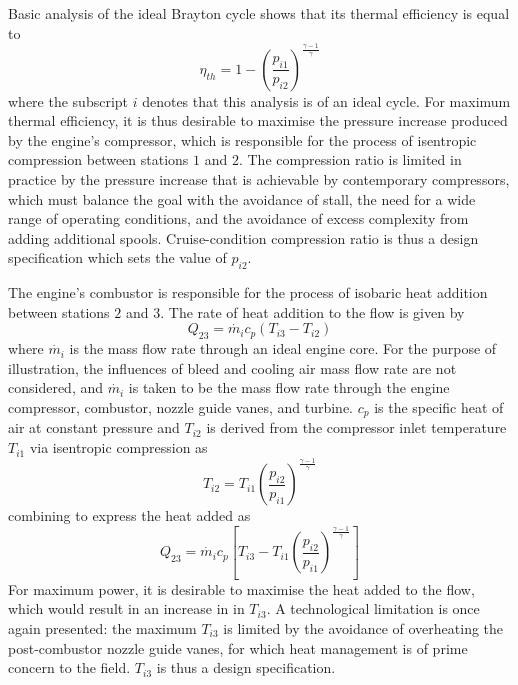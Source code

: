 \documentclass[a4paper, 11pt, oneside]{report}
\begin{document}
Basic analysis of the ideal Brayton cycle shows that its thermal efficiency is equal to
\begin{equation}
	\eta_{th} = 
	1 - 
	\left(
		\frac{p_{i1}}{p_{i2}}
	\right)
	^
	\frac{\gamma-1}{\gamma}
\end{equation}
where the subscript $i$ denotes that this analysis is of an ideal cycle. For maximum thermal efficiency, it is thus desirable to maximise the pressure increase produced by the engine's compressor, which is responsible for the process of isentropic compression between stations $1$ and $2$. The compression ratio is limited in practice by the pressure increase that is achievable by contemporary compressors, which must balance the goal with the avoidance of stall, the need for a wide range of operating conditions, and the avoidance of excess complexity from adding additional spools. Cruise-condition compression ratio is thus a design specification which sets the value of $p_{i2}$.

The engine's combustor is responsible for the process of isobaric heat addition between stations $2$ and $3$. The rate of heat addition to the flow is given by
\begin{equation}
	Q_{23} = 
	\dot{m_i}
	c_p
	\left(
		T_{i3} - T_{i2}
	\right)
\end{equation}
where $\dot{m_i}$ is the mass flow rate through an ideal engine core. For the purpose of illustration, the influences of bleed and cooling air mass flow rate are not considered, and $\dot{m_i}$ is taken to be the mass flow rate through the engine compressor, combustor, nozzle guide vanes, and turbine. $c_p$ is the specific heat of air at constant pressure and $T_{i2}$ is derived from the compressor inlet temperature $T_{i1}$ via isentropic compression as
\begin{equation}
	T_{i2} = 
	T_{i1}
	\left(
		\frac{p_{i2}}{p_{i1}}
	\right)
	^
	\frac{\gamma-1}{\gamma}
\end{equation}
combining to express the heat added as
\begin{equation}
	Q_{23} = 
	\dot{m_i}
	c_p
	\left[
		T_{i3} - 
		T_{i1}
		\left(
			\frac{p_{i2}}{p_{i1}}
		\right)
		^
		\frac{\gamma-1}{\gamma}
	\right]
\end{equation}
For maximum power, it is desirable to maximise the heat added to the flow, which would result in an increase in in $T_{i3}$. A technological limitation is once again presented: the maximum $T_{i3}$ is limited by the avoidance of overheating the post-combustor nozzle guide vanes, for which heat management is of prime concern to the field. $T_{i3}$ is thus a design specification.
\end{document}
